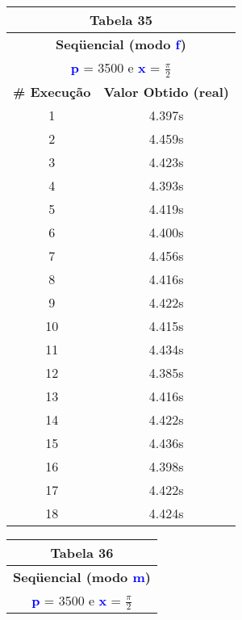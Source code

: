 \documentclass[11pt]{article}
\begin{document}
\begin{table}[!h]
	\begin{center}
		\begin{minipage}{0.48\textwidth}
			\begin{tabular}{| c | c |}
			\hline
			\multicolumn{2}{|c|}{\textbf{Tabela 35}} \\ \hline
			\multicolumn{2}{|c|}{\textbf{Seqüencial (modo \textbf{\textcolor{blue}{f}})}} \\
			\multicolumn{2}{|c|}{\textbf{\textcolor{blue}{p}} = 3500 e \textbf{\textcolor{blue}{x}} = $\frac{\pi}{2}$} \\ [0.2ex]
			\hline
				\textbf{\# Execução} &  \textbf{Valor Obtido (real)} \\ \hline
				1 & 4.397s \\ \hline
				2 & 4.459s \\ \hline
				3 & 4.423s \\ \hline
				4 & 4.393s \\ \hline
				5 & 4.419s \\ \hline
				6 & 4.400s \\ \hline
				7 & 4.456s \\ \hline
				8 & 4.416s \\ \hline
				9 & 4.422s \\ \hline
				10 & 4.415s \\ \hline
				11 & 4.434s \\ \hline
				12 & 4.385s \\ \hline
				13 & 4.416s \\ \hline
				14 & 4.422s \\ \hline
				15 & 4.436s \\ \hline
				16 & 4.398s \\ \hline
				17 & 4.422s \\ \hline
				18 & 4.424s \\ \hline
			\end{tabular}
		\end{minipage}
		\begin{minipage}{0.48\textwidth}
			\begin{tabular}{| c | c |}
			\hline
			\multicolumn{2}{|c|}{\textbf{Tabela 36}} \\ \hline
			\multicolumn{2}{|c|}{\textbf{Seqüencial (modo \textbf{\textcolor{blue}{m}})}} \\
			\multicolumn{2}{|c|}{\textbf{\textcolor{blue}{p}} = 3500 e \textbf{\textcolor{blue}{x}} = $\frac{\pi}{2}$} \\ [0.2ex]
			\hline

\end{tabular}
\end{minipage}
\end{center}
\end{table}
\end{document}
